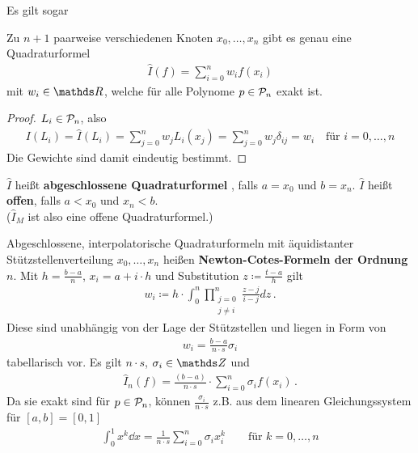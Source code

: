 Es gilt sogar
\begin{Leme}\label{7.2.1}
  Zu $n+1$ paarweise verschiedenen Knoten $x_0,\dotsc, x_n$
  gibt es genau eine Quadraturformel
  \begin{gather*}
    \hat{I}(f) = \sum_{i=0}^nw_if(x_i)
  \end{gather*}
  mit $w_i\in\R$, welche für alle Polynome $p\in\mathcal{P}_n$ exakt ist.

  \begin{proof}
    $L_i\in\mathcal{P}_n$, also 
    \begin{gather*}
      I(L_i)=\hat{I}(L_i)=\sum_{j=0}^{n}w_jL_i(x_j)
                         =\sum_{j=0}^{n}w_j\delta_{ij}
                         =w_i \quad \text{für } i=0,\dotsc,n
    \end{gather*}
    Die Gewichte sind damit eindeutig bestimmt.
  \end{proof}
\end{Leme}

\begin{Defe}\label{7.2.2}
  $\hat{I}$ heißt \textbf{abgeschlossene Quadraturformel}
  ,
  falls $a=x_0$ und $b=x_n$.
  $\hat{I}$ heißt \textbf{offen}, falls $a<x_0$ und $x_n<b$.\\
  ($\hat{I}_M$ ist also eine offene Quadraturformel.)
\end{Defe}

Abgeschlossene, interpolatorische Quadraturformeln mit
äquidistanter Stützstellenverteilung $x_0, \dotsc, x_n$ heißen
\textbf{Newton-Cotes-Formeln der Ordnung $n$}.
Mit $h=\frac{b-a}{n}$, $x_i=a+i\cdot h$ und Substitution
$z\coloneqq \frac{t-a}{h}$ gilt
\begin{gather}
  w_i\coloneqq h
  \cdot \int_0^n \prod_{\substack{j=0\\j\neq i}}^n\frac{z-j}{i-j}dz\, .
  \label{VII.2.3}
\end{gather}
Diese sind unabhängig von der Lage der Stützstellen
und liegen in Form von
\begin{gather*}
  w_i=\frac{b-a}{n\cdot s}\sigma_i
\end{gather*}
tabellarisch vor.  Es gilt $n\cdot s$, $\sigma_i\in\Z$ und
\begin{gather}
  \hat{I}_n(f) = \frac{(b-a)}{n\cdot s}
  \cdot \sum_{i=0}^{n}\sigma_i f(x_i)\,.
  \label{VII.2.4}
\end{gather}
Da sie exakt sind für $p\in \mathcal{P}_n$,
können $\frac{\sigma_i}{n\cdot s}$ z.B. aus dem
linearen Gleichungssystem für $[a,b]=[0,1]$
\begin{gather*}
  \int_0^1x^k\dd x=\frac{1}{n\cdot s}\sum_{i=0}^{n}\sigma_ix_i^k
  \qquad \text{für } k=0,\dotsc,n
\end{gather*}

